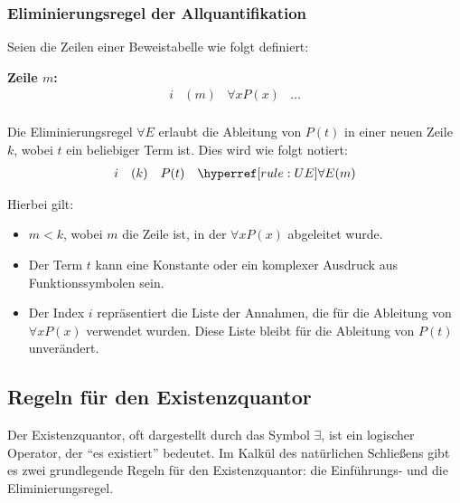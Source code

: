 \documentclass[main.tex]{subfiles}
\begin{document}
\subsubsection{Eliminierungsregel der  Allquantifikation}
\label{rule:UE}
\begin{definition}
Seien die Zeilen einer Beweistabelle wie folgt definiert:

\textbf{Zeile \(m\):}
\[
\begin{array}{llll}
    i & (m) & \forall x P(x) & \dots \\
\end{array}
\]

Die Eliminierungsregel \(\forall E\) erlaubt die Ableitung von \(P(t)\) in einer neuen Zeile \(k\), wobei \(t\) ein beliebiger Term ist. Dies wird wie folgt notiert:
\[
\begin{array}{llll}
    i & (k) & P(t) & \rUE{m} \\
\end{array}
\]

Hierbei gilt:
\begin{itemize}
    \item \(m < k\), wobei \(m\) die Zeile ist, in der \(\forall x P(x)\) abgeleitet wurde.
    \item Der Term \(t\) kann eine Konstante oder ein komplexer Ausdruck aus Funktionssymbolen sein.
    \item Der Index \(i\) repräsentiert die Liste der Annahmen, die für die Ableitung von \(\forall x P(x)\) verwendet wurden. Diese Liste bleibt für die Ableitung von \(P(t)\) unverändert.
\end{itemize}
\end{definition}

\subsection{Regeln für den Existenzquantor}

Der Existenzquantor, oft dargestellt durch das Symbol \(\exists\), ist ein logischer Operator, der \enquote{es existiert} bedeutet. Im Kalkül des natürlichen Schließens gibt es zwei grundlegende Regeln für den Existenzquantor: die Einführungs- und die Eliminierungsregel.
\end{document}
